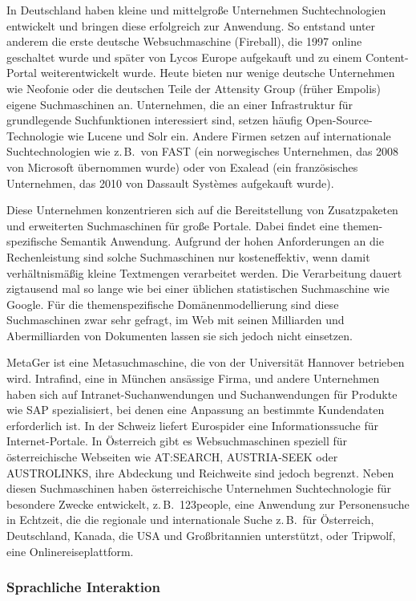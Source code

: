 \begin{multicols}{2}
In Deutschland haben kleine und mittelgroße Unternehmen Suchtechnologien entwickelt und bringen diese erfolgreich zur Anwendung. So entstand unter anderem die erste deutsche Websuchmaschine (Fireball), die 1997 online geschaltet wurde und später von Lycos Europe aufgekauft und zu einem Con\-tent-Por\-tal weiterentwickelt wurde. Heute bieten nur wenige deutsche Unternehmen wie Neofonie oder die deutschen Teile der Attensity Group (früher Empolis) eigene Suchmaschinen an. Unternehmen, die an einer Infrastruktur für grundlegende Suchfunktionen interessiert sind, setzen häufig Open-Source-Tech\-no\-lo\-gie wie Lucene und Solr ein. Andere Firmen setzen auf internationale Suchtechnologien wie z.\,B.~von FAST (ein norwegisches Unternehmen, das 2008 von Microsoft übernommen wurde) oder von Exalead (ein französisches Unternehmen, das 2010 von Dassault Systèmes aufgekauft wurde).

Diese Unternehmen konzentrieren sich auf die Bereitstellung von Zusatzpaketen und erweiterten Suchmaschinen für große Portale. Dabei findet eine the\-men-spe\-zi\-fische Semantik Anwendung. Aufgrund der hohen Anforderungen an die Rechenleistung sind solche Suchmaschinen nur kosteneffektiv, wenn damit verhältnismäßig kleine Textmengen verarbeitet werden. Die Verarbeitung dauert zigtausend mal so lange wie bei einer üblichen statistischen Suchmaschine wie Google. Für die themenspezifische Domänenmodellierung sind diese Suchmaschinen zwar sehr gefragt, im Web mit seinen Milliarden und Abermilliarden von Dokumenten lassen sie sich jedoch nicht einsetzen.

MetaGer ist eine Metasuchmaschine, die von der Universität Hannover betrieben wird. Intrafind, eine in München ansässige Firma, und andere Unternehmen haben sich auf In\-tra\-net-Such\-an\-wen\-dungen und Suchanwendungen für Produkte wie SAP spezialisiert, bei denen eine Anpassung an bestimmte Kundendaten erforderlich ist. In der Schweiz liefert Eurospider eine Informationssuche für In\-ter\-net-Por\-tale. In Österreich gibt es Websuchmaschinen speziell für österreichische Webseiten wie AT:SEARCH, AUSTRIA-SEEK oder AUSTROLINKS, ihre Abdeckung und Reichweite sind jedoch begrenzt. Neben diesen Suchmaschinen haben österreichische Unternehmen Suchtechnologie für besondere Zwecke entwickelt, z.\,B.~123people, eine Anwendung zur Personensuche in Echtzeit, die die regionale und internationale Suche z.\,B.~für Österreich, Deutschland, Kanada, die USA und Großbritannien unterstützt, oder Tripwolf, eine Onlinereiseplattform.
  
\subsubsection{Sprachliche Interaktion}


\end{multicols}
